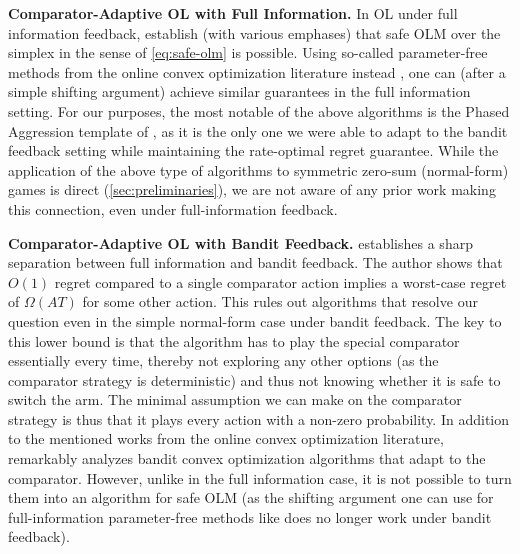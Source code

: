 \textbf{Comparator-Adaptive OL with Full Information.} In OL under full information feedback, \citet{hutter2005adaptive,even2008regret,kapralov2011prediction,koolen2013pareto,sani2014exploiting} establish (with various emphases) that safe OLM over the simplex in the sense of \cref{eq:safe-olm} is possible. Using so-called parameter-free methods from the online convex optimization literature instead \citep[e.g.]{orabona2016coin,cutkosky2018black,orabona2019modern}, one can (after a simple shifting argument) achieve similar guarantees in the full information setting. For our purposes, the most notable of the above algorithms is the Phased Aggression template of \citet{even2008regret}, as it is the only one we were able to adapt to the bandit feedback setting while maintaining the rate-optimal regret guarantee. While the application of the above type of algorithms to symmetric zero-sum (normal-form) games is direct (\cref{sec:preliminaries}), we are not aware of any prior work making this connection, even under full-information feedback.

\textbf{Comparator-Adaptive OL with Bandit Feedback.} \citet{lattimore2015pareto} establishes a sharp separation between full information and bandit feedback. The author shows that $O(1)$ regret compared to a single comparator action implies a worst-case regret of $\Omega(AT)$ for some other action. This rules out algorithms that resolve our question even in the simple normal-form case under bandit feedback. The key to this lower bound is that the algorithm has to play the special comparator essentially every time, thereby not exploring any other options (as the comparator strategy is deterministic) and thus not knowing whether it is safe to switch the arm. The minimal assumption we can make on the comparator strategy is thus that it plays every action with a non-zero probability. In addition to the mentioned works from the online convex optimization literature, \citet{van2020comparator} remarkably analyzes bandit convex optimization algorithms that adapt to the comparator. However, unlike in the full information case, it is not possible to turn them into an algorithm for safe OLM (as the shifting argument one can use for full-information parameter-free methods like \citet{orabona2016coin,cutkosky2018black,orabona2019modern} does no longer work under bandit feedback).

